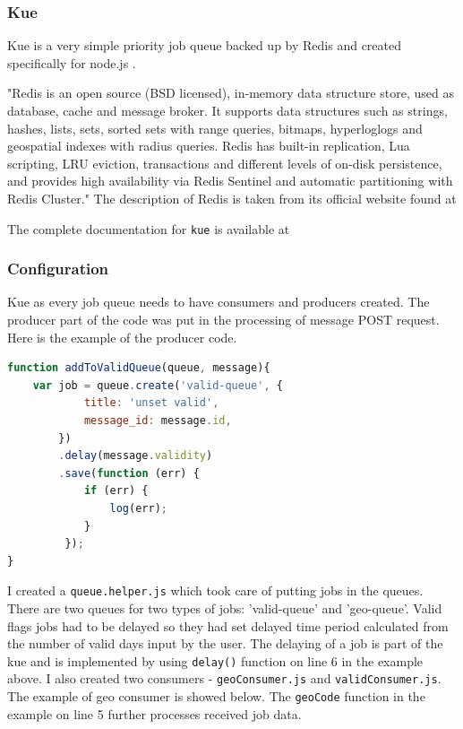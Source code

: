 \documentclass[thesis=M,english]{FITthesis}[2012/10/20]
\begin{document}
\subsubsection{Kue}

Kue is a very simple priority job queue backed up by Redis and created specifically for node.js .

"Redis is an open source (BSD licensed), in-memory data structure store, used as database, cache and message broker. It supports data structures such as strings, hashes, lists, sets, sorted sets with range queries, bitmaps, hyperloglogs and geospatial indexes with radius queries. Redis has built-in replication, Lua scripting, LRU eviction, transactions and different levels of on-disk persistence, and provides high availability via Redis Sentinel and automatic partitioning with Redis Cluster." The description of Redis is taken from its official website found at \cite{redis}

The complete documentation for \verb|kue| is available at \cite{kue}

\subsubsection{Configuration}

Kue as every job queue needs to have consumers and producers created. The producer part of the code was put in the processing of message POST request. Here is the example of the producer code. 

\begin{lstlisting}[language=JavaScript]
function addToValidQueue(queue, message){
    var job = queue.create('valid-queue', {
            title: 'unset valid',
            message_id: message.id,
        })
        .delay(message.validity)
        .save(function (err) {
            if (err) {
            	log(err);
            }
         });
}
\end{lstlisting}


I created a \verb|queue.helper.js| which took care of putting jobs in the queues. There are two queues for two types of jobs: 'valid-queue' and 'geo-queue'. Valid flags jobs had to be delayed so they had set delayed time period calculated from the number of valid days input by the user. The delaying of a job is part of the kue and is implemented by using \verb|delay()| function on line 6 in the example above. I also created two consumers - \verb|geoConsumer.js| and \verb|validConsumer.js|. The example of geo consumer is showed below. The \verb|geoCode| function in the example on line 5 further processes received job data.
\end{document}
